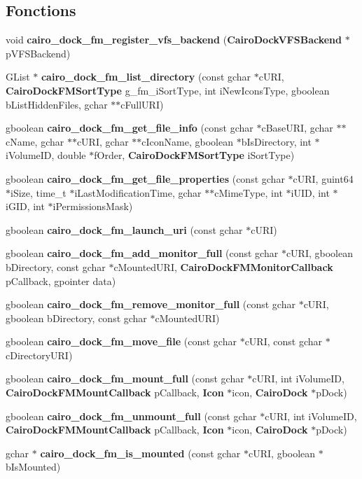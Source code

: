 \subsection*{Fonctions}
\begin{CompactItemize}
\item 
void {\bf cairo\_\-dock\_\-fm\_\-register\_\-vfs\_\-backend} ({\bf CairoDockVFSBackend} $\ast$pVFSBackend)
\item 
GList $\ast$ {\bf cairo\_\-dock\_\-fm\_\-list\_\-directory} (const gchar $\ast$cURI, {\bf CairoDockFMSortType} g\_\-fm\_\-iSortType, int iNewIconsType, gboolean bListHiddenFiles, gchar $\ast$$\ast$cFullURI)
\item 
gboolean {\bf cairo\_\-dock\_\-fm\_\-get\_\-file\_\-info} (const gchar $\ast$cBaseURI, gchar $\ast$$\ast$cName, gchar $\ast$$\ast$cURI, gchar $\ast$$\ast$cIconName, gboolean $\ast$bIsDirectory, int $\ast$iVolumeID, double $\ast$fOrder, {\bf CairoDockFMSortType} iSortType)
\item 
gboolean {\bf cairo\_\-dock\_\-fm\_\-get\_\-file\_\-properties} (const gchar $\ast$cURI, guint64 $\ast$iSize, time\_\-t $\ast$iLastModificationTime, gchar $\ast$$\ast$cMimeType, int $\ast$iUID, int $\ast$iGID, int $\ast$iPermissionsMask)
\item 
gboolean {\bf cairo\_\-dock\_\-fm\_\-launch\_\-uri} (const gchar $\ast$cURI)
\item 
gboolean {\bf cairo\_\-dock\_\-fm\_\-add\_\-monitor\_\-full} (const gchar $\ast$cURI, gboolean bDirectory, const gchar $\ast$cMountedURI, {\bf CairoDockFMMonitorCallback} pCallback, gpointer data)
\item 
gboolean {\bf cairo\_\-dock\_\-fm\_\-remove\_\-monitor\_\-full} (const gchar $\ast$cURI, gboolean bDirectory, const gchar $\ast$cMountedURI)
\item 
gboolean {\bf cairo\_\-dock\_\-fm\_\-move\_\-file} (const gchar $\ast$cURI, const gchar $\ast$cDirectoryURI)
\item 
gboolean {\bf cairo\_\-dock\_\-fm\_\-mount\_\-full} (const gchar $\ast$cURI, int iVolumeID, {\bf CairoDockFMMountCallback} pCallback, {\bf Icon} $\ast$icon, {\bf CairoDock} $\ast$pDock)
\item 
gboolean {\bf cairo\_\-dock\_\-fm\_\-unmount\_\-full} (const gchar $\ast$cURI, int iVolumeID, {\bf CairoDockFMMountCallback} pCallback, {\bf Icon} $\ast$icon, {\bf CairoDock} $\ast$pDock)
\item 
gchar $\ast$ {\bf cairo\_\-dock\_\-fm\_\-is\_\-mounted} (const gchar $\ast$cURI, gboolean $\ast$bIsMounted)
\item 
$$
\end{CompactItemize}
